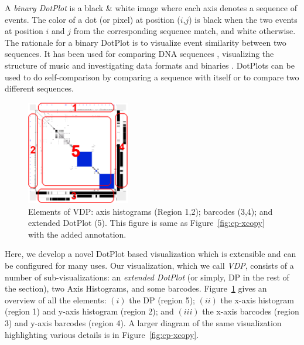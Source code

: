 
A {\em binary DotPlot} is a black \& white image
where each axis denotes a sequence of events.
The color of a dot (or pixel) at position ($i$,$j$) is black
when the two events at position $i$ and $j$ from the corresponding sequence
match, and white otherwise.
The rationale for a binary DotPlot is to visualize event similarity
between two sequences.
It has been used for comparing DNA sequences \cite{maizel1981enhanced},
visualizing the structure of music \cite{foote1999visualizing}
and investigating data formats and binaries \cite{kaminsky2006black}.
DotPlots can be used to do self-comparison
by comparing a sequence with itself or to compare
two different sequences.

\begin{figure}[tb]
\begin{center}
\includegraphics[width=0.4\textwidth]{lviz/elements.png}
\caption{Elements of VDP: axis histograms (Region 1,2);
barcodes (3,4); and extended DotPlot (5). This figure is same as
Figure~\ref{fig:cp-xcopy} with the added annotation.}
\label{fig:elements}
\end{center}
\end{figure}

Here, we develop a novel DotPlot based visualization which is
extensible and can be configured for many uses.
Our visualization, which we call {\em VDP},
consists of a number of sub-visualizations:
an {\em extended DotPlot} (or simply, DP in the rest of the section), two
Axis Histograms, and some barcodes.
Figure~\ref{fig:elements} gives an overview of all the elements:
$(i)$ the DP (region 5);
$(ii)$ the x-axis histogram (region 1) and
y-axis histogram (region 2);
and $(iii)$ the x-axis barcodes (region 3) and
y-axis barcodes (region 4).
A larger diagram of the same visualization highlighting various
details is in Figure~\ref{fig:cp-xcopy}.

